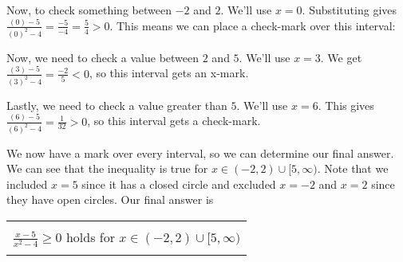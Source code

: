 {\begin{center}
\label{fig:ineq_num_line4}
\end{center}

Now, to check something between $-2$ and $2$. We'll use $x=0$. Substituting gives $\frac{(0)-5}{(0)^2-4} = \frac{-5}{-4} =\frac{5}{4} >0$. This means we can place a check-mark over this interval:

\begin{center}
\label{fig:ineq_num_line5}
\end{center}

Now, we need to check a value between $2$ and $5$. We'll use $x=3$. We get $\frac{(3)-5}{(3)^2-4}=\frac{-2}{5} <0$, so this interval gets an x-mark.

\begin{center}
\label{fig:ineq_num_line6}
\end{center}

Lastly, we need to check a value greater than $5$. We'll use $x=6$. This gives $\frac{(6)-5}{(6)^2-4} = \frac{1}{32} >0$, so this interval gets a check-mark.

\begin{center}
\label{fig:ineq_num_line7}
\end{center}

We now have a mark over every interval, so we can determine our final answer. We can see that the inequality is true for $x \in (-2,2) \cup [5,\infty)$. Note that we included $x=5$ since it has a closed circle and excluded $x=-2$ and $x=2$ since they have open circles. Our final answer is
	\begin{center}
		\begin{tabular}{| c |} \hline
			\\[-4pt]
			$\displaystyle \frac{x-5}{x^2-4} \geq 0$ holds for $x \in (-2,2) \cup [5, \infty)$ \\[-4pt]
			\\\hline
		\end{tabular}
	\end{center}}\\



